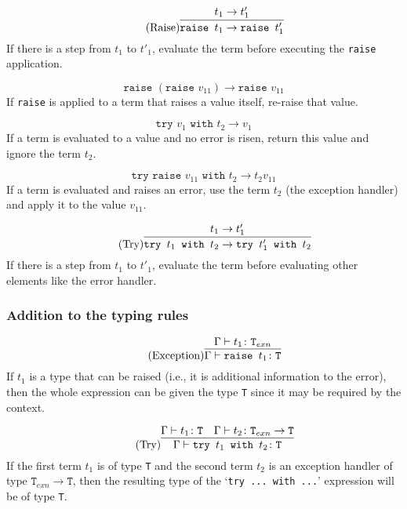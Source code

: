 \begin{equation*}
    \tag{Raise}
    \infer{
        \texttt{raise } t_1 \rightarrow \texttt{raise } t'_1
    }{
        t_1 \rightarrow t'_1
    }
\end{equation*}
If there is a step from $t_1$ to $t'_1$, evaluate the term
before executing the \texttt{raise} application.

\begin{equation*}
    \tag{Re-Raise}
    \texttt{raise } (\texttt{raise } v_{11}) \rightarrow \texttt{raise } v_{11}
\end{equation*}
If \texttt{raise} is applied to a term that raises a value itself, re-raise that
value.

\begin{equation*}
    \tag{Try Value}
    \texttt{try } v_1 \texttt{ with } t_2 \rightarrow v_1
\end{equation*}
If a term is evaluated to a value and no error is risen, return
this value and ignore the term $t_2$.

\begin{equation*}
    \tag{Try Error}
    \texttt{try } \texttt{raise } v_{11} \texttt{ with } t_2 \rightarrow t_2 v_{11}
\end{equation*}
If a term is evaluated and raises an error, use the term $t_2$ (the exception
handler) and apply it to the value $v_{11}$.

\begin{equation*}
    \tag{Try}
    \infer{
        \texttt{try } t_1 \texttt{ with } t_2 \rightarrow \texttt{try } t'_1 \texttt{ with } t_2
    }{
        t_1 \rightarrow t'_1
    }
\end{equation*}
If there is a step from $t_1$ to $t'_1$, evaluate the term
before evaluating other elements like the error handler.

\subsubsection{Addition to the typing rules \cite{pierce2002ProgLang}}
\begin{equation*}
    \tag{Exception}
    \infer{
        \Gamma \vdash \texttt{raise } t_1 \colon \texttt{T}
    }{
        \Gamma \vdash t_1 \colon \texttt{T}_{exn}
    }
\end{equation*}
If $t_1$ is a type that can be raised (i.e., it is
additional information to the error), then the whole
expression can be given the type \texttt{T} since it may be required
by the context.

\begin{equation*}
    \tag{Try}
    \infer{
        \Gamma \vdash \texttt{try } t_1 \texttt{ with } t_2 \colon \texttt{T}
    }{
        \Gamma \vdash t_1 \colon \texttt{T}
        &
        \Gamma \vdash t_2 \colon \texttt{T}_{exn} \rightarrow \texttt{T}
    }
\end{equation*}
If the first term $t_1$ is of type \texttt{T} and the second
term $t_2$ is an exception handler of type $\texttt{T}_{exn} \rightarrow \texttt{T}$,
then the resulting type of the `\texttt{try ... with ...}' expression will
be of type \texttt{T}.
